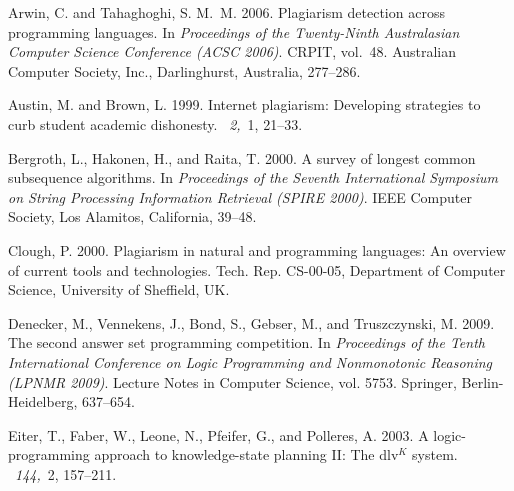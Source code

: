 \documentclass{tlp}
\begin{document}
\begin{thebibliography}{}

{\sc Arwin, C.} {\sc and} {\sc Tahaghoghi, S. M.~M.} 2006.
\newblock Plagiarism detection across programming languages.
\newblock In {\em Proceedings of the Twenty-Ninth Australasian Computer Science
  Conference {\rm (}ACSC 2006{\rm )}}. CRPIT, vol.~48. Australian Computer
  Society, Inc., Darlinghurst, Australia, 277--286.

{\sc Austin, M.} {\sc and} {\sc Brown, L.} 1999.
\newblock Internet plagiarism: Developing strategies to curb student academic
  dishonesty.
~{\em 2,\/}~1, 21--33.

{\sc Bergroth, L.}, {\sc Hakonen, H.}, {\sc and} {\sc Raita, T.} 2000.
\newblock A survey of longest common subsequence algorithms.
\newblock In {\em Proceedings of the Seventh International Symposium on String
  Processing Information Retrieval {\rm (}SPIRE 2000{\rm )}}. IEEE Computer
  Society, Los Alamitos, California, 39--48.

{\sc Clough, P.} 2000.
\newblock Plagiarism in natural and programming languages: An overview of
  current tools and technologies.
\newblock Tech. Rep. CS-00-05, Department of Computer Science, University of
  Sheffield, UK.

{\sc Denecker, M.}, {\sc Vennekens, J.}, {\sc Bond, S.}, {\sc Gebser, M.}, {\sc
  and} {\sc Truszczynski, M.} 2009.
\newblock The second answer set programming competition.
\newblock In {\em Proceedings of the Tenth International Conference on Logic
  Programming and Nonmonotonic Reasoning {\rm(}LPNMR 2009{\rm)}}. Lecture Notes
  in Computer Science, vol. 5753. Springer, Berlin-Heidelberg, 637--654.

{\sc Eiter, T.}, {\sc Faber, W.}, {\sc Leone, N.}, {\sc Pfeifer, G.}, {\sc and}
  {\sc Polleres, A.} 2003.
\newblock A logic-programming approach to knowledge-state planning {II}: The
  {\sc dlv}$^{K}$ system.
~{\em 144,\/}~2, 157--211.


\end{thebibliography}
\end{document}
